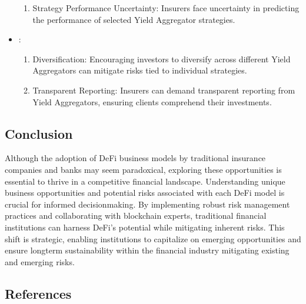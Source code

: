 \documentclass[letterpaper,10pt,english]{jupyterBook}
\begin{document}
\begin{itemize}
\begin{enumerate}
\item {} 
\sphinxAtStartPar
Strategy Performance Uncertainty: Insurers face uncertainty in predicting the performance of selected Yield Aggregator strategies.

\end{enumerate}

\item {} 
\sphinxAtStartPar
{}:
\begin{enumerate}
%
\item {} 
\sphinxAtStartPar
Diversification: Encouraging investors to diversify across different Yield Aggregators can mitigate risks tied to individual strategies.

\item {} 
\sphinxAtStartPar
Transparent Reporting: Insurers can demand transparent reporting from Yield Aggregators, ensuring clients comprehend their investments.

\end{enumerate}

\end{itemize}


\subsection{Conclusion}
\label{\detokenize{BOER/boer:conclusion}}
\sphinxAtStartPar
Although the adoption of DeFi business models by traditional insurance companies and banks may seem paradoxical, exploring these opportunities is essential to thrive in a competitive financial landscape. Understanding unique business opportunities and potential risks associated with each DeFi model is crucial for informed decision\sphinxhyphen{}making. By implementing robust risk management practices and collaborating with blockchain experts, traditional financial institutions can harness DeFi’s potential while mitigating inherent risks. This shift is strategic, enabling institutions to capitalize on emerging opportunities and ensure long\sphinxhyphen{}term sustainability within the financial industry mitigating existing and emerging risks.




\subsection{References}
\label{\detokenize{BOER/boer:references}}\label{\detokenize{BOER/boer:id1}}
\sphinxstepscope
\end{document}
